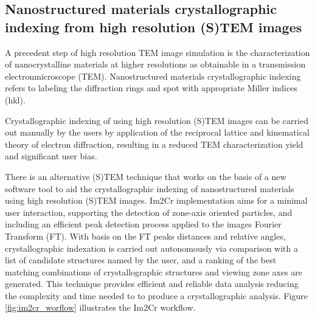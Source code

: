 \documentclass[
  oneside,
  11pt, a4paper,
  footinclude=true,
  headinclude=true,
  cleardoublepage=empty
]{scrbook}
\begin{document}
	\subsection{Nanostructured materials crystallographic indexing from high resolution (S)TEM images}
	
	A precedent step of high resolution TEM image simulation is the characterization of nanocrystalline materials at higher resolutions as obtainable in a transmission electronmicroscope (TEM). Nanostructured materials crystallographic indexing refers to labeling the diffraction rings and spot with appropriate Miller indices (hkl).\par 
	 Crystallographic indexing of  using high resolution (S)TEM images
	 can be carried out manually by the users by application of the reciprocal lattice and kinematical theory of electron diffraction, resulting in a reduced TEM characterization yield and significant user bias.\par 
	 There is an alternative (S)TEM technique that works on the basis of a new software tool to aid the crystallographic indexing of nanostructured materials using high resolution (S)TEM images. Im2Cr \citep{asilva2016} implementation aims for a minimal user interaction, supporting the detection of zone-axis oriented particles, and including an efficient peak detection process applied to the images Fourier Transform (FT). With basis on the FT peaks distances and relative angles, crystallographic indexation is carried out autonomously via comparison with a list of candidate structures named by the user, and a ranking of the best matching combinations of crystallographic structures and viewing zone axes are generated. This technique provides efficient and reliable data analysis reducing the complexity and time needed to to produce a crystallographic analysis. Figure \ref{fig:im2cr_worflow} illustrates the Im2Cr workflow. 
\end{document}

